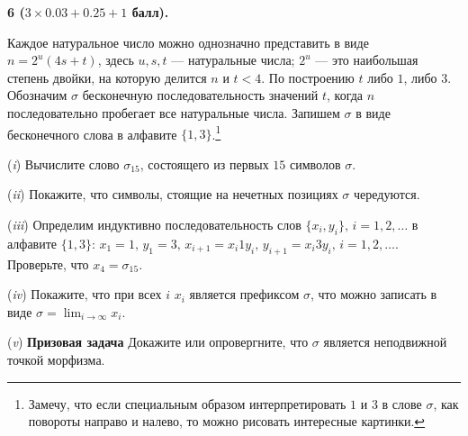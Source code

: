 \documentclass[10pt,twocolumn]{article}
\begin{document}
{\smallskip

{\bf 6 ($3\times 0.03+0.25+1$ балл).} 
{\footnotesize Каждое натуральное число можно однозначно представить в виде
$n=2^u(4s+t)$, здесь $u,s,t$ --- натуральные числа; 
$2^u$ --- это наибольшая степень двойки, на которую делится
$n$ и $t<4$. По построению $t$ либо $1$, либо $3$.
Обозначим $\sigma$ бесконечную 
последовательность значений $t$, когда $n$ последовательно 
пробегает все натуральные числа. Запишем $\sigma$ в виде
бесконечного слова в алфавите $\{1,3\}$.\footnote{Замечу, что если
специальным образом интерпретировать $1$ и $3$ в слове $\sigma$, как повороты направо и 
налево, то можно рисовать интересные картинки. 
}

}

\noindent ({\em i})  Вычислите слово $\sigma_{15}$,
состоящего из первых $15$ символов $\sigma$.

\noindent ({\em ii})  Покажите, что символы, стоящие на нечетных позициях
$\sigma$ чередуются.

\noindent ({\em iii}) Определим индуктивно последовательность слов 
$\{x_i,y_i\},\, i=1,2,\dots$
в алфавите $\{1,3\}$: $x_1=1,\, y_1=3,\, x_{i+1}=x_i 1 y_i,\,
y_{i+1}=x_i 3 y_i,\, i=1,2,\dots$. Проверьте, что $x_4=\sigma_{15}$.

\noindent ({\em iv}) Покажите, что при всех $i$ $x_i$ является префиксом
$\sigma$, что можно записать в виде $\sigma=\lim_{i\to \infty} x_i$.


\noindent ({\em v}) {\bf Призовая задача} Докажите или опровергните,
что $\sigma$ является неподвижной точкой морфизма.

}
\end{document}
